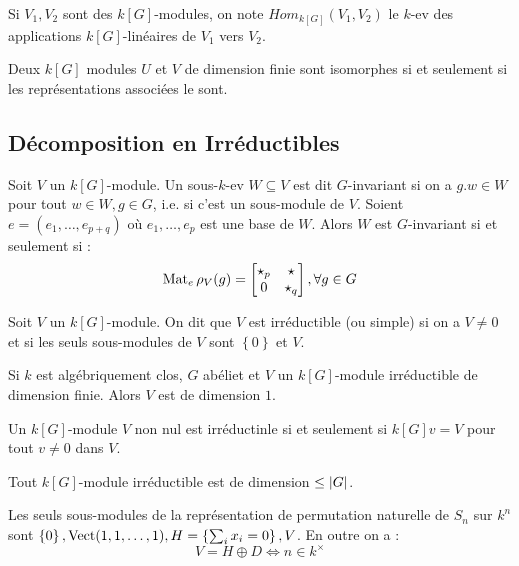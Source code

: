 \documentclass{cours}
\begin{document}
\begin{definition}
    Si $V_{1}, V_{2}$ sont des $k[G]$-modules, on note $Hom_{k[G]}(V_{1}, V_{2})$ le $k$-ev des applications $k[G]$-linéaires de $V_{1}$ vers $V_{2}$. 
\end{definition}

\begin{proposition}
    Deux $k[G]$ modules $U$ et $V$ de dimension finie sont isomorphes si et seulement si les représentations associées le sont. 
\end{proposition}

\subsection{Décomposition en Irréductibles}
\begin{definition}
    Soit $V$ un $k[G]$-module. Un sous-$k$-ev $W \subseteq V$ est dit $G$-invariant si on a $g.w \in W$ pour tout $w \in W, g \in G$, i.e. si c'est un sous-module de $V$. Soient $e = \left(e_{1}, \ldots, e_{p +q}\right)$ où $e_{1}, \ldots, e_{p}$ est une base de $W$. Alors $W$ est $G$-invariant si et seulement si : 
    \[
        \operatorname{Mat}_{e}\rho_{V}(g) = \left[\begin{matrix}
            \star_{p} & \star\\
            0 & \star_{q}
        \end{matrix}\right], \forall g \in G
    \]
\end{definition}

\begin{definition}
    Soit $V$ un $k[G]$-module. On dit que $V$ est irréductible (ou simple) si on a $V \neq 0$ et si les seuls sous-modules de $V$ sont $\left\{0\right\}$ et $V$. 
\end{definition}
\begin{proposition}
    Si $k$ est algébriquement clos, $G$ abéliet et $V$ un $k[G]$-module irréductible de dimension finie. Alors $V$ est de dimension $1$.
\end{proposition}
\begin{proposition}
    Un $k[G]$-module $V$ non nul est irréductinle si et seulement si $k[G]v = V$ pour tout $v \neq 0$ dans $V$. 
\end{proposition}

\begin{proposition}
    Tout $k[G]$-module irréductible est de dimension $\leq\left|G\right|$.
\end{proposition}

\begin{proposition}
    Les seuls sous-modules de la représentation de permutation naturelle de $S_{n}$ sur $k^{n}$ sont $\left\{0\right\}, \operatorname{Vect}(1, 1,\ldots, 1), H = \left\{\sum_{i} x_{i} = 0\right\}, V$. En outre on a : 
    \[
        V = H \oplus D \Longleftrightarrow n \in k^{\times}
    \]
\end{proposition}
\end{document}
